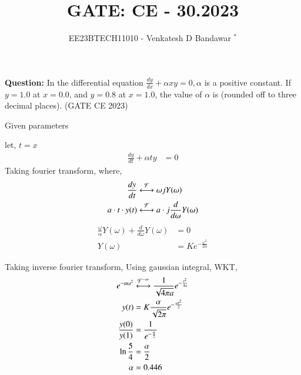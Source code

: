 \documentclass[journal,12pt,twocolumn]{IEEEtran}
\theoremstyle{remark}
\begin{document}

\vspace{3cm}

\title{GATE: CE - 30.2023}
\author{EE23BTECH11010 - Venkatesh D Bandawar $^{*}$%
}
\maketitle
\bigskip


\textbf{Question:} In the differential equation $\frac{dy}{dx} + \alpha x y = 0, \alpha$ is a positive constant. If $y = 1.0$ at
$x = 0.0$, and $y = 0.8$ at $x = 1.0$, the value of $\alpha$ is (rounded off to three decimal places).  \hfill(GATE CE 2023)

\solution
\begin{table}[!h] 
\centering

\caption{Given parameters}
\label{given parameters list.gate.ce.30}
\end{table}



let, $t=x$
\begin{align}
    \frac{dy}{dt} + \alpha t y &= 0
\end{align}
Taking fourier transform,
where,
\begin{align}
    \frac{dy}{dt} & \system{\mathcal{F}} \omega j Y(\omega) \\
    a \cdot t \cdot y(t) & \system{\mathcal{F}} a \cdot j \frac{d}{d\omega} Y(\omega)
\end{align}
\begin{align}
    \frac{\omega}{\alpha} Y(\omega) + \frac{d}{d\omega} Y(\omega) &= 0\\
    Y(\omega) &= K e^{-\frac{\omega^2}{2\alpha} }
\end{align}

Taking inverse fourier transform, Using gaussian integral,
WKT, 
\begin{align}
     e^{-a\omega^2} &\system{\mathcal{F}^{-1}} \frac{1}{\sqrt{4\pi a}} e^{-\frac{t^2}{4a}} \\
    y(t) &= K \frac{\alpha}{\sqrt{2\pi}} e^{-\frac{\alpha t^2}{2}}\\
    \frac{y(0)}{y(1)} &= \frac{1}{e^{-\frac{\alpha}{2}}}\\
    \ln\frac{5}{4} &= \frac{\alpha}{2} \\
    \alpha &= 0.446 
\end{align}
\end{document}
